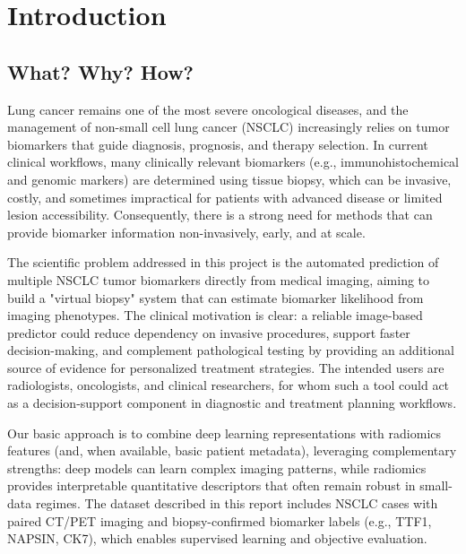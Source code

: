 \documentclass[twoside,runningheads,a4paper,11pt]{report}
\begin{document}
\tableofcontents

\newpage

\listoftables
\listoffigures
\listofalgorithms

\newpage


\newpage



\chapter{Introduction}
\label{chapter:introduction}

\section{What? Why? How?}
\label{section:what}

Lung cancer remains one of the most severe oncological diseases, and the management of non-small cell lung cancer (NSCLC) increasingly relies on tumor biomarkers that guide diagnosis, prognosis, and therapy selection. In current clinical workflows, many clinically relevant biomarkers (e.g., immunohistochemical and genomic markers) are determined using tissue biopsy, which can be invasive, costly, and sometimes impractical for patients with advanced disease or limited lesion accessibility. Consequently, there is a strong need for methods that can provide biomarker information non-invasively, early, and at scale.

The scientific problem addressed in this project is the automated prediction of multiple NSCLC tumor biomarkers directly from medical imaging, aiming to build a "virtual biopsy" system that can estimate biomarker likelihood from imaging phenotypes. The clinical motivation is clear: a reliable image-based predictor could reduce dependency on invasive procedures, support faster decision-making, and complement pathological testing by providing an additional source of evidence for personalized treatment strategies. The intended users are radiologists, oncologists, and clinical researchers, for whom such a tool could act as a decision-support component in diagnostic and treatment planning workflows.

Our basic approach is to combine deep learning representations with radiomics features (and, when available, basic patient metadata), leveraging complementary strengths: deep models can learn complex imaging patterns, while radiomics provides interpretable quantitative descriptors that often remain robust in small-data regimes. The dataset described in this report includes NSCLC cases with paired CT/PET imaging and biopsy-confirmed biomarker labels (e.g., TTF1, NAPSIN, CK7), which enables supervised learning and objective evaluation.
\end{document}
